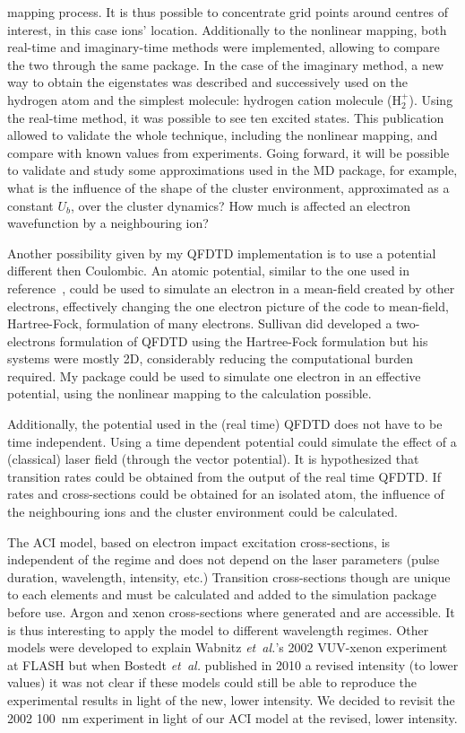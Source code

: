 mapping process. It is thus possible to concentrate grid points around centres
of interest, in this case ions' location. Additionally to the nonlinear mapping,
both real-time and imaginary-time methods were implemented, allowing to compare
the two through the same package. In the case of the imaginary method, a new
way to obtain the eigenstates was described and successively used on the
hydrogen atom and the simplest molecule: hydrogen cation molecule (H$_{2}^{+}$).
Using the real-time method, it was possible to see ten excited states. This
publication allowed to validate the whole technique, including the nonlinear
mapping, and compare with known values from experiments. Going forward, it will
be possible to validate and study some approximations used in the MD package,
for example, what is the influence of the shape of the cluster environment,
approximated as a constant $U_b$, over the cluster dynamics? How much is
affected an electron wavefunction by a neighbouring ion?

Another possibility given by my QFDTD implementation is to use a potential
different then Coulombic. An atomic potential, similar to the one used in
reference~\cite{Walters2006}, could be used to simulate an electron in a
mean-field created by other electrons, effectively changing the one electron
picture of the code to mean-field, Hartree-Fock, formulation of many electrons.
Sullivan did developed a two-electrons formulation of QFDTD using the
Hartree-Fock formulation but his systems were mostly 2D, considerably reducing
the computational burden required. My package could be used to simulate one
electron in an effective potential, using the nonlinear mapping to the
calculation possible.

Additionally, the potential used in the (real time) QFDTD does not have to be
time independent. Using a time dependent potential could simulate the effect of
a (classical) laser field (through the vector potential). It is hypothesized
that transition rates could be obtained from the output of the real time QFDTD.
If rates and cross-sections could be obtained for an isolated atom, the
influence of the neighbouring ions and the cluster environment could be
calculated.


The ACI model, based on electron impact excitation cross-sections, is independent of the
regime and does not depend on the laser parameters (pulse duration, wavelength,
intensity, etc.) Transition cross-sections though are unique to each elements
and must be calculated and added to the simulation package before use. Argon
and xenon cross-sections where generated and are accessible. It is thus
interesting to apply the model to different wavelength regimes. Other models were developed
to explain Wabnitz \textit{et~al.}'s 2002 VUV-xenon experiment at FLASH but when
Bostedt \textit{et~al.} published in 2010 a revised intensity (to lower values) it was
not clear if these models could still be able to reproduce the experimental results
in light of the new, lower intensity. We decided to revisit the 2002 100~nm
experiment in light of our ACI model at the revised, lower intensity.

